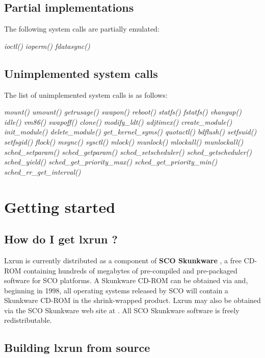 \documentclass[letterpaper]{article}
\begin{document}
\subsection{Partial implementations}

The following system calls are partially emulated:

{\itshape ioctl() ioperm() fdatasync()\/}




\subsection{Unimplemented system calls}

The list of unimplemented system calls is as follows:

{\itshape mount() umount() getrusage() swapon() reboot() statfs() fstatfs() vhangup() 
idle() vm86() swapoff()
clone() modify\_ldt() adjtimex() create\_module() 
init\_module()
delete\_module() get\_kernel\_syms() quotactl() bdflush() 
setfsuid()
setfsgid() flock() msync() sysctl() mlock() munlock() mlockall() munlockall()
sched\_setparam() sched\_getparam() sched\_setscheduler()
sched\_getscheduler() sched\_yield()
sched\_get\_priority\_max()
sched\_get\_priority\_min()
sched\_rr\_get\_interval()\/}




\section{Getting started}




\subsection{How do I get lxrun ?}

Lxrun is currently distributed as a component of {\bfseries SCO Skunkware}
,
a free CD-ROM containing hundreds of megabytes of pre-compiled and pre-packaged 
software for SCO platforms. A Skunkware CD-ROM can be obtained via
 and, beginning in 1998, all operating
systems released by SCO will contain a Skunkware CD-ROM in the shrink-wrapped
product. Lxrun may also be obtained via the SCO Skunkware web site at 
.
All SCO Skunkware software is freely redistributable.




\subsection{Building lxrun from source}
\end{document}
